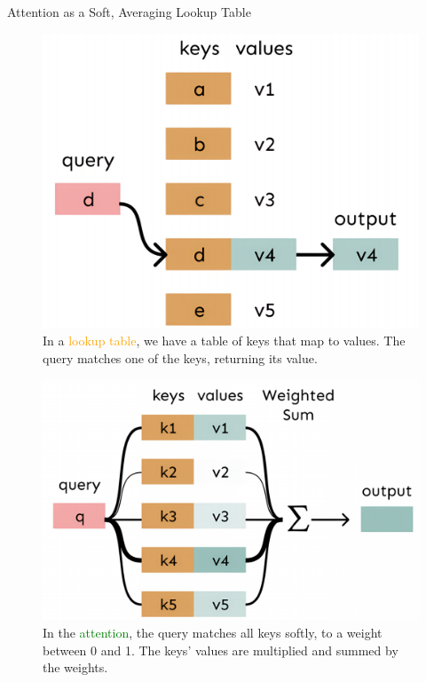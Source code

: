 \documentclass[serif, aspectratio=169]{beamer}
\begin{document}
\begin{frame}{Attention as a Soft, Averaging Lookup Table}
\begin{figure}[!htb]
    \centering
    \begin{minipage}{0.4\textwidth}
        \centering
        \includegraphics[width=\textwidth]{pic/attention-3.png}
        In a \textcolor{orange}{lookup table}, we have a table of keys that map to values. The query matches one of the keys, returning its value.
        \label{fig:attention-4}
        
    \end{minipage}%
    \hfill
    {\vrule width 1pt}
    \hfill
    \begin{minipage}{0.48\textwidth}
        \centering
        \includegraphics[width=\textwidth]{pic/attention-4.png}
                In the \textcolor{green}{attention}, the query matches all keys softly, to a weight between 0 and 1. The keys' values are multiplied and summed by the weights.
        \label{fig:attention-3}
    \end{minipage}
\end{figure}
    
\end{frame}
\end{document}
